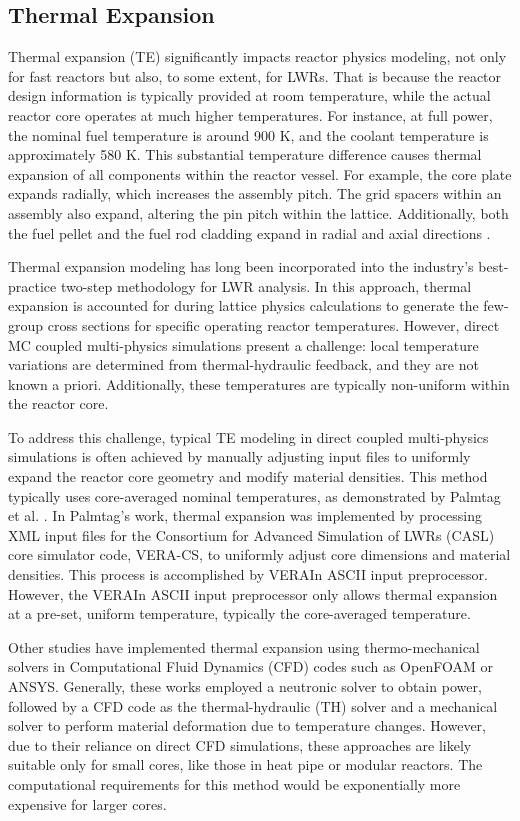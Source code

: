 \subsection{Thermal Expansion} \label{sec12}

Thermal expansion (TE) significantly impacts reactor physics modeling, not only for fast reactors but also, to some extent, for LWRs. That is because the reactor design information is typically provided at room temperature, while the actual reactor core operates at much higher temperatures. For instance, at full power, the nominal fuel temperature is around 900 K, and the coolant temperature is approximately 580 K. This substantial temperature difference causes thermal expansion of all components within the reactor vessel. For example, the core plate expands radially, which increases the assembly pitch. The grid spacers within an assembly also expand, altering the pin pitch within the lattice. Additionally, both the fuel pellet and the fuel rod cladding expand in radial and axial directions \cite{palmtag}.

Thermal expansion modeling has long been incorporated into the industry's best-practice two-step methodology for LWR analysis. In this approach, thermal expansion is accounted for during lattice physics calculations to generate the few-group cross sections for specific operating reactor temperatures. However, direct MC coupled multi-physics simulations present a challenge: local temperature variations are determined from thermal-hydraulic feedback, and they are not known a priori. Additionally, these temperatures are typically non-uniform within the reactor core.

To address this challenge, typical TE modeling in direct coupled multi-physics simulations is often achieved by manually adjusting input files to uniformly expand the reactor core geometry and modify material densities. This method typically uses core-averaged nominal temperatures, as demonstrated by Palmtag et al. \cite{palmtag}. In Palmtag's work, thermal expansion was implemented by processing XML input files for the Consortium for Advanced Simulation of LWRs (CASL) core simulator code, VERA-CS, to uniformly adjust core dimensions and material densities. This process is accomplished by VERAIn ASCII input preprocessor. However, the VERAIn ASCII input preprocessor only allows thermal expansion at a pre-set, uniform temperature, typically the core-averaged temperature.

Other studies \cite{fiorina,ma_2021,guo} have implemented thermal expansion using thermo-mechanical solvers in Computational Fluid Dynamics (CFD) codes such as OpenFOAM or ANSYS. Generally, these works employed a neutronic solver to obtain power, followed by a CFD code as the thermal-hydraulic (TH) solver and a mechanical solver to perform material deformation due to temperature changes. However, due to their reliance on direct CFD simulations, these approaches are likely suitable only for small cores, like those in heat pipe or modular reactors. The computational requirements for this method would be exponentially more expensive for larger cores.


